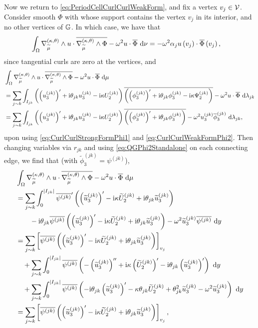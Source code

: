 \documentclass[11pt]{report}
\begin{document}
Now we return to \eqref{eq:PeriodCellCurlCurlWeakForm}, and fix a vertex $v_j\in\mathcal{V}$.
Consider smooth $\Phi$ with whose support contains the vertex $v_j$ in its interior, and no other vertices of $\mathbb{G}$.
In which case, we have that
\begin{align*}
	\int_{\Omega} \nabla_{\widetilde{\mu}}^{\left( \kappa, \theta \right)}\wedge u\cdot\overline{\nabla_{\widetilde{\mu}}^{\left( \kappa, \theta \right)}\wedge\Phi} - \omega^2 u\cdot\overline{\Phi}  \ \mathrm{d}\nu
	&= - \omega^2 \alpha_j u\left( v_j \right)\cdot\overline{\Phi}\left( v_j \right),
\end{align*}
since tangential curls are zero at the vertices, and
\begin{align*}
	& \int_{\Omega} \nabla_{\widetilde{\mu}}^{\left( \kappa, \theta \right)}\wedge u\cdot\overline{\nabla_{\widetilde{\mu}}^{\left( \kappa, \theta \right)}\wedge\Phi} - \omega^2 u\cdot\overline{\Phi}  \ \mathrm{d}\mu \\
	&= \sum_{j\sim k}\int_{I_{jk}} \left(  \left( u_3^{(jk)} \right)' + \mathrm{i}\theta_{jk} u_3^{(jk)} - \mathrm{i}\kappa U_2^{(jk)}  \right)\overline{\left(  \left( \phi_3^{(jk)} \right)' + \mathrm{i}\theta_{jk} \phi_3^{(jk)} - \mathrm{i}\kappa \Psi_2^{(jk)}  \right)} - \omega^2 u\cdot\overline{\Phi}  \ \mathrm{d}\lambda_{jk} \\
	&= \sum_{j\sim k}\int_{I_{jk}} \left(  \left( u_3^{(jk)} \right)' + \mathrm{i}\theta_{jk} u_3^{(jk)} - \mathrm{i}\kappa U_2^{(jk)}  \right)\overline{\left(  \left( \phi_3^{(jk)} \right)' + \mathrm{i}\theta_{jk} \phi_3^{(jk)}  \right)} - \omega^2 u_3^{(jk)}\overline{\phi}_3^{(jk)}  \ \mathrm{d}\lambda_{jk},
\end{align*}
upon using \eqref{eq:CurlCurlStrongFormPhi1} and \eqref{eq:CurlCurlWeakFormPhi2}.
Then changing variables via $r_{jk}$ and using \eqref{eq:QGPhi2Standalone} on each connecting edge, we find that (with $\widetilde{\phi}_3^{(jk)} = \psi^{(jk)}$),
\begin{align*}
	& \integral{\ddom}{ \ktcurl{\dddmes}u\cdot\overline{\ktcurl{\dddmes}\Phi} - \omega^2 u\cdot\overline{\Phi} }{\ddmes} \\
	&= \sum_{j\con k} \int_0^{\abs{I_{jk}}} 	\overline{\psi^{(jk)}}' \bracs{ \bracs{\widetilde{u}_3^{(jk)}}' - \rmi\wavenumber\widetilde{U}_2^{(jk)} + \rmi\qm_{jk}\widetilde{u}_3^{(jk)} } \\
		&\qquad -\rmi\qm_{jk}\overline{\psi^{(jk)}}\bracs{ \bracs{\widetilde{u}_3^{(jk)}}' - \rmi\wavenumber\widetilde{U}_2^{(jk)} + \rmi\qm_{jk}\widetilde{u}_3^{(jk)} }
		- \omega^2 \widetilde{u}_3^{(jk)}\overline{\psi^{(jk)}} \ \md y \\
	&= \sum_{j\con k}\sqbracs{ \overline{\psi^{(jk)}}\bracs{ \bracs{\widetilde{u}_3^{(jk)}}' - \rmi\wavenumber\widetilde{U}_2^{(jk)} + \rmi\qm_{jk}\widetilde{u}_3^{(jk)} } }_{v_j} \\
	&\quad + \sum_{j\con k}\int_0^{\abs{I_{jk}}} \overline{\psi^{(jk)}} \bracs{ -\bracs{\widetilde{u}_3^{(jk)}}'' + \rmi\wavenumber\bracs{\widetilde{U}_2^{(jk)}}' - \rmi\qm_{jk}\bracs{\widetilde{u}_3^{(jk)}}' } \ \md y \\
	&\quad + \sum_{j\con k}\int_0^{\abs{I_{jk}}} \overline{\psi^{(jk)}} \bracs{ - \rmi\qm_{jk}\bracs{\widetilde{u}_3^{(jk)}}' - \wavenumber\qm_{jk}\widetilde{U}_2^{(jk)} + \qm_{jk}^2\widetilde{u}_3^{(jk)} - \omega^2\widetilde{u}_3^{(jk)} } \ \md y \\
	&= \sum_{j\con k}\sqbracs{ \overline{\psi^{(jk)}}\bracs{ \bracs{\widetilde{u}_3^{(jk)}}' - \rmi\wavenumber\widetilde{U}_2^{(jk)} + \rmi\qm_{jk}\widetilde{u}_3^{(jk)} } }_{v_j},
\end{align*}
\end{document}
